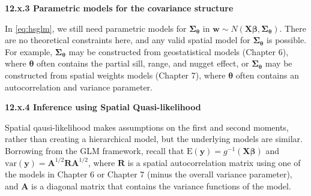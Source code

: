 \documentclass[12pt, titlepage]{article}
\begin{document}

{\large \flushleft \textbf{12.x.3 Parametric models for the covariance structure}}

In \eqref{eq:hsglm}, we still need parametric models for $\boldsymbol{\Sigma}_{\boldsymbol{\theta}}$ in $\mathbf{w} \sim N(\mathbf{X}\boldsymbol{\beta},\boldsymbol{\Sigma}_{\boldsymbol{\theta}})$.  There are no theoretical constraints here, and any valid spatial model for $\boldsymbol{\Sigma}_{\boldsymbol{\theta}}$ is possible. For example, $\boldsymbol{\Sigma}_{\boldsymbol{\theta}}$ may be constructed from geostatistical models (Chapter 6), where $\boldsymbol{\theta}$ often contains the partial sill, range, and nugget effect, or $\boldsymbol{\Sigma}_{\boldsymbol{\theta}}$ may be constructed from spatial weights models (Chapter 7), where $\boldsymbol{\theta}$ often contains an autocorrelation and variance parameter.


{\large \flushleft \textbf{12.x.4 Inference using Spatial Quasi-likelihood}}

Spatial qausi-likelihood makes assumptions on the first and second moments, rather than creating a hierarchical model, but the underlying models are similar.  Borrowing from the GLM framework, recall that $\textrm{E}(\mathbf{y}) = g^{-1}(\mathbf{\mathbf{X}\boldsymbol{\beta}})$ and $\textrm{var}(\mathbf{y}) = \mathbf{A}^{1/2}\mathbf{R}\mathbf{A}^{1/2}$, where $\mathbf{R}$ is a spatial autocorrelation matrix using one of the models in Chapter 6 or Chapter 7 (minus the overall variance parameter), and $\mathbf{A}$ is a diagonal matrix that contains the variance functions of the model.  
\end{document}
